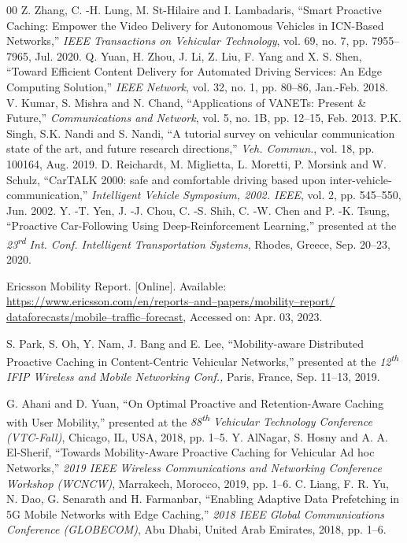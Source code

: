 \documentclass{ieeeaccess}
\begin{document}
\begin{thebibliography}{00}
 Z. Zhang, C. -H. Lung, M. St-Hilaire and I. Lambadaris,  ``Smart Proactive Caching: Empower the Video Delivery for Autonomous Vehicles in ICN-Based Networks,'' \emph{IEEE Transactions on Vehicular Technology}, vol. 69, no. 7, pp. 7955--7965, Jul. 2020.
 Q. Yuan, H. Zhou, J. Li, Z. Liu, F. Yang and X. S. Shen,  ``Toward Efficient Content Delivery for Automated Driving Services: An Edge Computing Solution,'' \emph{IEEE Network}, vol. 32, no. 1, pp. 80--86, Jan.-Feb. 2018.
 V. Kumar, S. Mishra and N. Chand,  ``Applications of VANETs: Present \& Future,'' \emph{Communications and Network}, vol. 5, no. 1B, pp. 12--15, Feb. 2013.
 P.K. Singh, S.K. Nandi and S. Nandi,  ``A tutorial survey on vehicular communication state of the art, and future research directions,'' \emph{Veh. Commun.}, vol. 18, pp. 100164, Aug. 2019.
 D. Reichardt, M. Miglietta, L. Moretti, P. Morsink and W. Schulz,  ``CarTALK 2000: safe and comfortable driving based upon inter-vehicle-communication,'' \emph{Intelligent Vehicle Symposium, 2002. IEEE}, vol. 2, pp. 545--550, Jun. 2002.
 Y. -T. Yen, J. -J. Chou, C. -S. Shih, C. -W. Chen and P. -K. Tsung,  ``Proactive Car-Following Using Deep-Reinforcement Learning,'' presented at the \emph{23\textsuperscript{rd} Int. Conf. Intelligent Transportation Systems}, Rhodes, Greece, Sep. 20--23, 2020.

Ericsson Mobility Report. [Online]. Available: \underline{https://www.ericsson.com/en/reports--and--papers/mobility--report/}\\ \underline{dataforecasts/mobile--traffic--forecast}, Accessed on: Apr. 03, 2023.

 S. Park, S. Oh, Y. Nam, J. Bang and E. Lee,  ``Mobility-aware Distributed Proactive Caching in Content-Centric Vehicular Networks,'' presented at the \emph{12\textsuperscript{th} IFIP Wireless and Mobile Networking Conf.,} Paris, France, Sep. 11--13, 2019.

 G. Ahani and D. Yuan, ``On Optimal Proactive and Retention-Aware Caching with User Mobility,'' presented at the \emph{88\textsuperscript{th} Vehicular Technology Conference (VTC-Fall)}, Chicago, IL, USA, 2018, pp. 1--5.
 Y. AlNagar, S. Hosny and A. A. El-Sherif, ``Towards Mobility-Aware Proactive Caching for Vehicular Ad hoc Networks,'' \emph{2019 IEEE Wireless Communications and Networking Conference Workshop (WCNCW)}, Marrakech, Morocco, 2019, pp. 1--6.
 C. Liang, F. R. Yu, N. Dao, G. Senarath and H. Farmanbar, ``Enabling Adaptive Data Prefetching in 5G Mobile Networks with Edge Caching,'' \emph{2018 IEEE Global Communications Conference (GLOBECOM)}, Abu Dhabi, United Arab Emirates, 2018, pp. 1--6.


\end{thebibliography}
\end{document}
